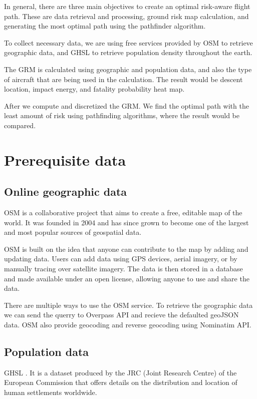 \documentclass[12pt]{report}
\begin{document}
        In general, there are three main objectives to create an optimal risk-aware flight path. These are data
        retrieval and processing, ground risk map calculation, and generating the most optimal path using the pathfinder
        algorithm.

        To collect necessary data, we are using free services provided by \ac{OSM} \cite{noauthor_openstreetmap_2022} to retrieve geographic
        data, and \ac{GHSL} \cite{noauthor_global_2023} to retrieve population density throughout the earth.

        The \ac{GRM} is calculated using geographic and population data, and also the type of aircraft that are being used in
        the calculation. The result would be descent location, impact energy, and fatality probability heat map. 
        
        After we compute and discretized the GRM. We find the optimal path with the least amount of risk using
        pathfinding algorithms, where the result would be compared.

    \section{Prerequisite data}
        \subsection{Online geographic data}
            OSM \cite{noauthor_openstreetmap_2022} is a collaborative project that aims to create a free, editable map of the world. It was founded in
            2004 and has since grown to become one of the largest and most popular sources of geospatial data.

            OSM is built on the idea that anyone can contribute to the map by adding and updating data. Users can add
            data using \ac{GPS} devices, aerial imagery, or by manually tracing over satellite imagery. The data is then
            stored in a database and made available under an open license, allowing anyone to use and share the data.

            There are multiple ways to use the OSM service. To retrieve the geographic data we can send the querry to
            Overpass \ac{API} and recieve the defaulted \ac{geoJSON} data. OSM also provide geocoding and reverse geocoding using
            Nominatim API.

        \subsection{Population data}
            GHSL \cite{noauthor_global_2023}. It is a dataset produced by the JRC (Joint Research Centre) of the European Commission that
            offers details on the distribution and location of human settlements worldwide.
\end{document}
